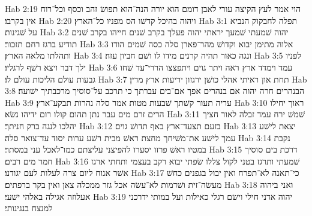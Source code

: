Hab 2:19  הוי אמר לעץ הקיצה עורי לאבן דומם הוא יורה הנה־הוא תפושׂ זהב וכסף וכל־רוח אין בקרבו׃
Hab 2:20  ויהוה בהיכל קדשׁו הס מפניו כל־הארץ׃
Hab 3:1  תפלה לחבקוק הנביא על שׁגינות׃
Hab 3:2  יהוה שׁמעתי שׁמעך יראתי יהוה פעלך בקרב שׁנים חייהו בקרב שׁנים תודיע ברגז רחם תזכור׃
Hab 3:3  אלוה מתימן יבוא וקדושׁ מהר־פארן סלה כסה שׁמים הודו ותהלתו מלאה הארץ׃
Hab 3:4  ונגה כאור תהיה קרנים מידו לו ושׁם חביון עזה׃
Hab 3:5  לפניו ילך דבר ויצא רשׁף לרגליו׃
Hab 3:6  עמד וימדד ארץ ראה ויתר גוים ויתפצצו הררי־עד שׁחו גבעות עולם הליכות עולם לו׃
Hab 3:7  תחת און ראיתי אהלי כושׁן ירגזון יריעות ארץ מדין׃
Hab 3:8  הבנהרים חרה יהוה אם בנהרים אפך אם־בים עברתך כי תרכב על־סוסיך מרכבתיך ישׁועה׃
Hab 3:9  עריה תעור קשׁתך שׁבעות מטות אמר סלה נהרות תבקע־ארץ׃
Hab 3:10  ראוך יחילו הרים זרם מים עבר נתן תהום קולו רום ידיהו נשׂא׃
Hab 3:11  שׁמשׁ ירח עמד זבלה לאור חציך יהלכו לנגה ברק חניתך׃
Hab 3:12  בזעם תצעד־ארץ באף תדושׁ גוים׃
Hab 3:13  יצאת לישׁע עמך לישׁע את־משׁיחך מחצת ראשׁ מבית רשׁע ערות יסוד עד־צואר סלה׃
Hab 3:14  נקבת במטיו ראשׁ פרזו יסערו להפיצני עליצתם כמו־לאכל עני במסתר׃
Hab 3:15  דרכת בים סוסיך חמר מים רבים׃
Hab 3:16  שׁמעתי ותרגז בטני לקול צללו שׂפתי יבוא רקב בעצמי ותחתי ארגז אשׁר אנוח ליום צרה לעלות לעם יגודנו׃
Hab 3:17  כי־תאנה לא־תפרח ואין יבול בגפנים כחשׁ מעשׂה־זית ושׁדמות לא־עשׂה אכל גזר ממכלה צאן ואין בקר ברפתים׃
Hab 3:18  ואני ביהוה אעלוזה אגילה באלהי ישׁעי׃
Hab 3:19  יהוה אדני חילי וישׂם רגלי כאילות ועל במותי ידרכני למנצח בנגינותי׃



